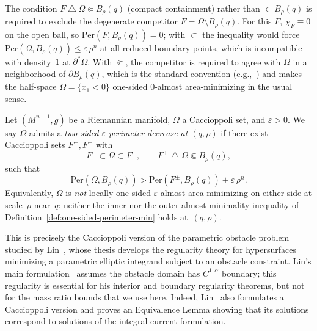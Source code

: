 \begin{remark}\label{rem:compact-containment}
The condition $F \mathbin{\triangle} \Omega \Subset B_\rho(q)$ (compact containment) rather than $\subset B_\rho(q)$ is required to exclude the degenerate competitor $F = \Omega \setminus B_\rho(q)$. For this $F$, $\chi_F \equiv 0$ on the open ball, so $\mathrm{Per}(F, B_\rho(q)) = 0$; with $\subset$ the inequality would force $\mathrm{Per}(\Omega, B_\rho(q)) \leq \varepsilon\,\rho^n$ at all reduced boundary points, which is incompatible with density~$1$ at $\partial^*\Omega$. With $\Subset$, the competitor is required to agree with $\Omega$ in a neighborhood of $\partial B_\rho(q)$, which is the standard convention (e.g.,~\cite[Chapter~21]{Mag12}) and makes the half-space $\Omega = \{x_1 < 0\}$ one-sided $0$-almost area-minimizing in the usual sense.
\end{remark}

\begin{definition}\label{def:two-sided-decrease}
Let $(M^{n+1}, g)$ be a Riemannian manifold, $\Omega$ a Caccioppoli set, and $\varepsilon > 0$.
We say $\Omega$ admits a \emph{two-sided $\varepsilon$-perimeter decrease at $(q, \rho)$} if there exist Caccioppoli sets $F^-, F^+$ with
\[
    F^- \subset \Omega \subset F^+, \qquad F^\pm \mathbin{\triangle} \Omega \Subset B_\rho(q),
\]
such that
\[
    \mathrm{Per}(\Omega, B_\rho(q)) > \mathrm{Per}(F^\pm, B_\rho(q)) + \varepsilon\,\rho^n.
\]
Equivalently, $\Omega$ is \emph{not} locally one-sided $\varepsilon$-almost area-minimizing on either side at scale~$\rho$ near~$q$: neither the inner nor the outer almost-minimality inequality of Definition~\ref{def:one-sided-perimeter-min} holds at~$(q, \rho)$.
\end{definition}

This is precisely the Caccioppoli version of the parametric obstacle problem studied by Lin~\cite{Lin85}, whose thesis develops the regularity theory for hypersurfaces minimizing a parametric elliptic integrand subject to an obstacle constraint.
Lin's main formulation~\cite[\S0.2]{Lin85} assumes the obstacle domain has $C^{1,\alpha}$ boundary; this regularity is essential for his interior and boundary regularity theorems, but not for the mass ratio bounds that we use here.
Indeed, Lin~\cite[\S0.2, p.~12--13]{Lin85} also formulates a Caccioppoli version and proves an Equivalence Lemma showing that its solutions correspond to solutions of the integral-current formulation.


